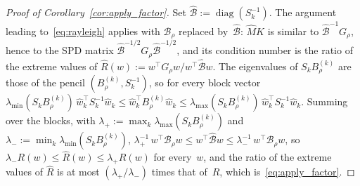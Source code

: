 \documentclass[hidelinks]{siamart}
\theoremstyle{nonumberplain}
\numberwithin{theorem}{section}
\begin{document}
\begin{proof}[Proof of Corollary~\textup{\ref{cor:apply_factor}}]
Set $\widehat{\mathcal{B}} := \operatorname{diag}(S_k^{-1})$.  The argument
leading to~\eqref{eq:rayleigh} applies with $\mathcal{B}_\rho$ replaced
by~$\widehat{\mathcal{B}}$: $\widehat{M} K$ is similar to
$\widehat{\mathcal{B}}^{-1} G_\rho$, hence to the SPD matrix
$\widehat{\mathcal{B}}^{-1/2} G_\rho \widehat{\mathcal{B}}^{-1/2}$, and its condition number
is the ratio of the extreme values of
$\widehat{R}(w) := w^\top G_\rho w / w^\top \widehat{\mathcal{B}} w$.  The
eigenvalues of $S_k B^{(k)}_\rho$ are those of the pencil
$(B^{(k)}_\rho, S_k^{-1})$, so for every block vector
$\lambda_{\min}(S_k B^{(k)}_\rho)\, \hat{w}_k^\top S_k^{-1} \hat{w}_k
 \leq \hat{w}_k^\top B^{(k)}_\rho \hat{w}_k
 \leq \lambda_{\max}(S_k B^{(k)}_\rho)\, \hat{w}_k^\top S_k^{-1} \hat{w}_k$.
Summing over the blocks, with $\lambda_+ := \max_k \lambda_{\max}(S_k B^{(k)}_\rho)$
and $\lambda_- := \min_k \lambda_{\min}(S_k B^{(k)}_\rho)$,
$\lambda_+^{-1}\, w^\top \mathcal{B}_\rho w \leq w^\top \widehat{\mathcal{B}} w
 \leq \lambda_-^{-1}\, w^\top \mathcal{B}_\rho w$, so
$\lambda_- R(w) \leq \widehat{R}(w) \leq \lambda_+ R(w)$ for every~$w$,
and the ratio of the extreme values of $\widehat{R}$ is at most
$(\lambda_+/\lambda_-)$ times that of~$R$, which
is~\eqref{eq:apply_factor}.


\end{proof}
\end{document}
